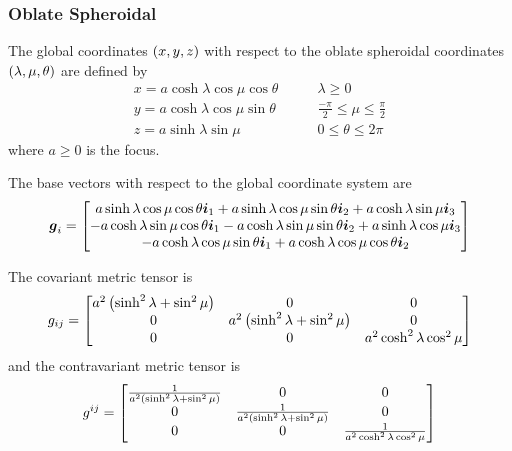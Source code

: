 \subsubsection{Oblate Spheroidal}

The global coordinates $\left( x,y,z \right)$ with respect to the oblate spheroidal
coordinates $\left( \lambda,\mu,\theta \right)$  are defined by
\begin{equation}
  \begin{aligned}
    x = a\cosh\lambda\cos\mu\cos\theta & \qquad \lambda \ge 0 \\
    y = a\cosh\lambda\cos\mu\sin\theta & \qquad \frac{-\pi}{2} \le \mu \le \frac{\pi}{2} \\
    z = a\sinh\lambda\sin\mu & \qquad 0 \le \theta \le 2\pi 
  \end{aligned}
\end{equation}
where $a\ge0$ is the focus.

The base vectors with respect to the global coordinate system are
\begin{equation}
  \boldsymbol{g}_{i}=\begin{bmatrix} 
    a\sinh\lambda\cos\mu\cos\theta\boldsymbol{i}_{1}+a\sinh\lambda\cos\mu\sin\theta\boldsymbol{i}_{2}+a\cosh\lambda\sin\mu\boldsymbol{i}_{3}\\
    -a\cosh\lambda\sin\mu\cos\theta\boldsymbol{i}_{1}-a\cosh\lambda\sin\mu\sin\theta\boldsymbol{i}_{2}+a\sinh\lambda\cos\mu\boldsymbol{i}_{3}\\    
    -a\cosh\lambda\cos\mu\sin\theta\boldsymbol{i}_{1}+a\cosh\lambda\cos\mu\cos\theta\boldsymbol{i}_{2}
  \end{bmatrix}
\end{equation}

The covariant metric tensor is
\begin{equation}
  g_{ij}=\begin{bmatrix}
    a^{2}\left( \sinh^{2}\lambda+\sin^{2}\mu \right) & 0 & 0 \\
    0 & a^{2}\left( \sinh^{2}\lambda+\sin^{2}\mu \right) & 0 \\
    0 & 0 & a^{2}\cosh^{2}\lambda\cos^{2}\mu 
  \end{bmatrix}
\end{equation}
and the contravariant metric tensor is
\begin{equation}
  g^{ij}=\begin{bmatrix}
    \frac{1}{a^{2}\left( \sinh^{2}\lambda+\sin^{2}\mu \right)}& 0 & 0 \\
    0 & \frac{1}{a^{2}\left( \sinh^{2}\lambda+\sin^{2}\mu \right)} & 0 \\
    0 & 0 & \frac{1}{a^{2}\cosh^{2}\lambda\cos^{2}\mu}
  \end{bmatrix}
\end{equation}


